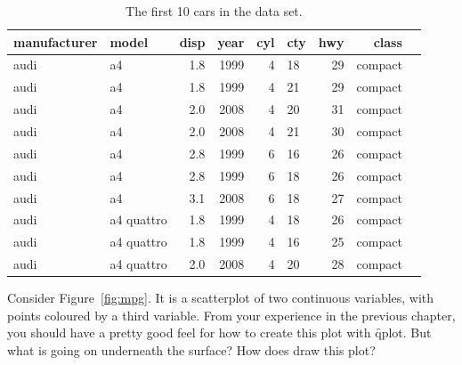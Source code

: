 
\begin{table}
  \begin{center}
  \begin{tabular}{llrrrlrrl}
    \toprule
    manufacturer & model & disp & year & cyl & cty & hwy & class \\
    \midrule
    audi & a4         & 1.8 & 1999 & 4 & 18 & 29 & compact\\
    audi & a4         & 1.8 & 1999 & 4 & 21 & 29 & compact\\
    audi & a4         & 2.0 & 2008 & 4 & 20 & 31 & compact\\
    audi & a4         & 2.0 & 2008 & 4 & 21 & 30 & compact\\
    audi & a4         & 2.8 & 1999 & 6 & 16 & 26 & compact\\
    audi & a4         & 2.8 & 1999 & 6 & 18 & 26 & compact\\
    audi & a4         & 3.1 & 2008 & 6 & 18 & 27 & compact\\
    audi & a4 quattro & 1.8 & 1999 & 4 & 18 & 26 & compact\\
    audi & a4 quattro & 1.8 & 1999 & 4 & 16 & 25 & compact\\
    audi & a4 quattro & 2.0 & 2008 & 4 & 20 & 28 & compact\\
        \bottomrule
  \end{tabular}
  \end{center}
  \caption{The first 10 cars in the  data set.}
  \label{tbl:mpg}
\end{table}

% 

Consider Figure~\ref{fig:mpg}.  It is a scatterplot of two continuous variables, with points coloured by a third variable.  From your experience in the previous chapter, you should have a pretty good feel for how to create this plot with \f{qplot}.  But what is going on underneath the surface?  How does \ggplot draw this plot?

